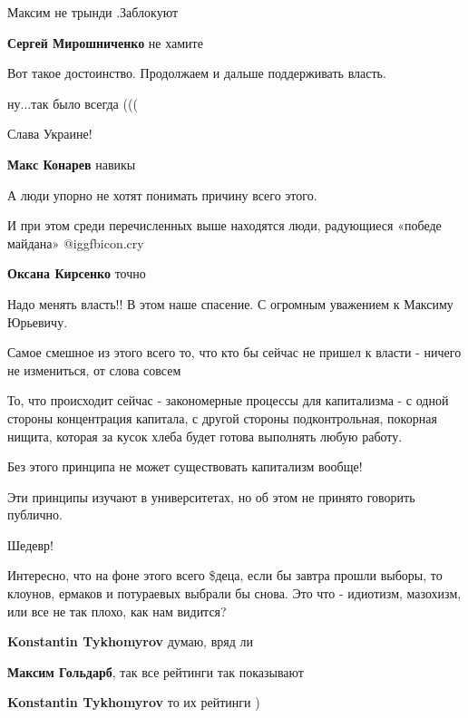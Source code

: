 \begin{itemize}
Максим не трынди .Заблокуют

\textbf{Сергей Мирошниченко} не хамите

Вот такое достоинство. Продолжаем и дальше поддерживать власть.

ну...так было всегда (((

Слава Украине!

\textbf{Макс Конарев} навикы

А люди упорно не хотят понимать причину всего этого.

И при этом среди перечисленных выше находятся люди, радующиеся «победе майдана»  @igg{fbicon.cry} 

\textbf{Оксана Кирсенко} точно

Надо менять власть!!
В этом наше спасение.
С огромным уважением к Максиму Юрьевичу.


Самое смешное из этого всего то, что кто бы сейчас не пришел к власти - ничего
не измениться, от слова совсем


То, что происходит сейчас - закономерные процессы для капитализма - с одной
стороны концентрация капитала, с другой стороны подконтрольная, покорная
нищита, которая за кусок хлеба будет готова выполнять любую работу.

Без этого принципа не может существовать капитализм вообще!

Эти принципы изучают в университетах, но об этом не принято говорить публично.

Шедевр!


Интересно, что на фоне этого всего \$деца, если бы завтра прошли выборы, то
клоунов, ермаков и потураевых выбрали бы снова. Это что - идиотизм, мазохизм,
или все не так плохо, как нам видится?

\begin{itemize} %
\textbf{Konstantin Tykhomyrov} думаю, вряд ли

\textbf{Максим Гольдарб}, так все рейтинги так показывают

\textbf{Konstantin Tykhomyrov} то их рейтинги )
\end{itemize} %


\end{itemize}
